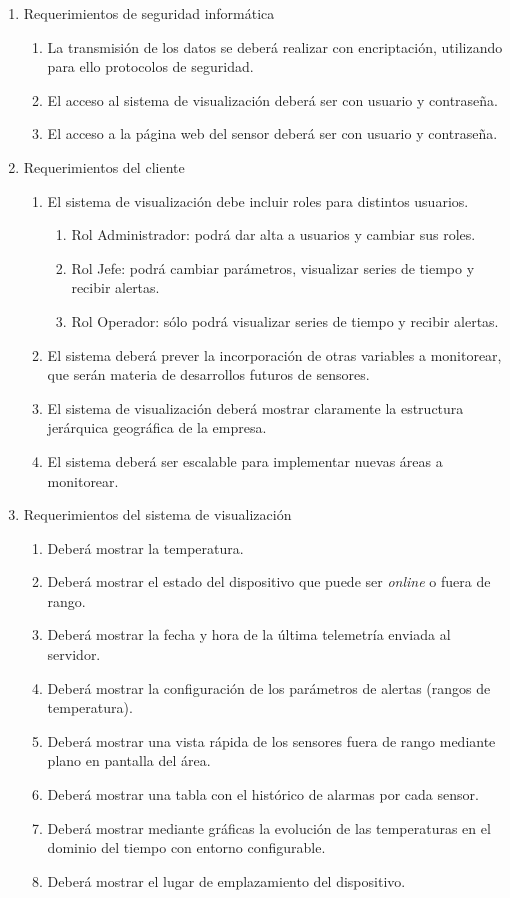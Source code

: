 \begin{enumerate}
\item Requerimientos de seguridad informática
	\begin{enumerate}
	\item La transmisión de los datos se deberá realizar con encriptación, utilizando para ello protocolos de seguridad.
	\item El acceso al sistema de visualización deberá ser con usuario y contraseña.
	\item El acceso a la página web del sensor deberá ser con usuario y contraseña.
	\end{enumerate}	

\item Requerimientos del cliente
	\begin{enumerate}
	\item El sistema de visualización debe incluir roles para distintos usuarios.
		\begin{enumerate}
		\item Rol Administrador: podrá dar alta a usuarios y cambiar sus roles.
	     \item Rol Jefe: podrá cambiar parámetros, visualizar series de tiempo y recibir alertas.
	     \item Rol Operador: sólo podrá visualizar series de tiempo y recibir alertas.
	     \end{enumerate}
	\item El sistema deberá prever la incorporación de otras variables a monitorear, que serán materia de desarrollos futuros de sensores.
	\item El sistema de visualización deberá mostrar claramente la estructura jerárquica geográfica de la empresa.	
	\item El sistema deberá ser escalable para implementar nuevas áreas a monitorear.
		\end{enumerate}
		
\item Requerimientos del sistema de visualización
    \begin{enumerate}
	\item Deberá mostrar la temperatura.
	\item Deberá mostrar el estado del dispositivo que puede ser \textit{online} o fuera de rango.
	\item Deberá mostrar la fecha y hora de la última telemetría enviada al servidor.
	\item Deberá mostrar la configuración de los parámetros de alertas (rangos de temperatura).
	\item Deberá mostrar una vista rápida de los sensores fuera de rango mediante plano en pantalla del área.
	\item Deberá mostrar una tabla con el histórico de alarmas por cada sensor.
    \item Deberá mostrar mediante gráficas la evolución de las temperaturas en el dominio del tiempo con entorno configurable.
    \item Deberá mostrar el lugar de emplazamiento del dispositivo.
	\end{enumerate}	
    


\end{enumerate}
